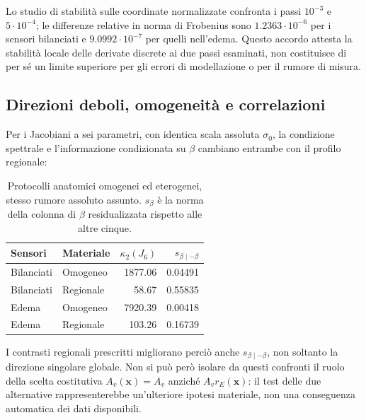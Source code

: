 Lo studio di stabilit\`a sulle coordinate normalizzate confronta i passi $10^{-3}$ e $5\cdot10^{-4}$; le differenze relative in norma di Frobenius sono $1.2363\cdot10^{-6}$ per i sensori bilanciati e $9.0992\cdot10^{-7}$ per quelli nell'edema. Questo accordo attesta la stabilit\`a locale delle derivate discrete ai due passi esaminati, non costituisce di per s\'e un limite superiore per gli errori di modellazione o per il rumore di misura.

\subsection*{Direzioni deboli, omogeneit\`a e correlazioni}
Per i Jacobiani a sei parametri, con identica scala assoluta $\sigma_0$, la condizione spettrale e l'informazione condizionata su $\beta$ cambiano entrambe con il profilo regionale:
\begin{table}[H]
\centering\caption{Protocolli anatomici omogenei ed eterogenei, stesso rumore assoluto assunto. $s_\beta$ \`e la norma della colonna di $\beta$ residualizzata rispetto alle altre cinque.}\label{tab:app-homo-hetero}
\small\setlength{\tabcolsep}{3.5pt}
\begin{tabular}{@{}llrr@{}}\toprule
Sensori&Materiale&$\kappa_2(J_6)$&$s_{\beta\mid-\beta}$\\\midrule
Bilanciati&Omogeneo&1877.06&0.04491\\
Bilanciati&Regionale&58.67&0.55835\\
Edema&Omogeneo&7920.39&0.00418\\
Edema&Regionale&103.26&0.16739\\\bottomrule
\end{tabular}
\end{table}
I contrasti regionali prescritti migliorano perci\`o anche $s_{\beta\mid-\beta}$, non soltanto la direzione singolare globale. Non si pu\`o per\`o isolare da questi confronti il ruolo della scelta costitutiva $A_v(\mathbf x)=A_v$ anzich\'e $A_vr_E(\mathbf x)$: il test delle due alternative rappresenterebbe un'ulteriore ipotesi materiale, non una conseguenza automatica dei dati disponibili.

